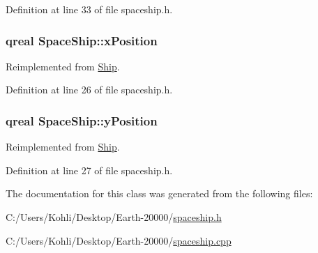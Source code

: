 Definition at line 33 of file spaceship.h.\hypertarget{class_space_ship_a4f960ec3383ec268c7db8c97b97a5c7d}{
\subsubsection[{xPosition}]{\setlength{\rightskip}{0pt plus 5cm}qreal {\bf SpaceShip::xPosition}}}
\label{class_space_ship_a4f960ec3383ec268c7db8c97b97a5c7d}


Reimplemented from \hyperlink{class_ship_a6ccec9a60696c66ede61af7397c73b3c}{Ship}.

Definition at line 26 of file spaceship.h.\hypertarget{class_space_ship_a01360fa6f81ff5c448d68142293f578b}{
\subsubsection[{yPosition}]{\setlength{\rightskip}{0pt plus 5cm}qreal {\bf SpaceShip::yPosition}}}
\label{class_space_ship_a01360fa6f81ff5c448d68142293f578b}


Reimplemented from \hyperlink{class_ship_a5964ed05737d3b6722c7af5e0f173475}{Ship}.

Definition at line 27 of file spaceship.h.

The documentation for this class was generated from the following files:\begin{DoxyCompactItemize}
\item 
C:/Users/Kohli/Desktop/Earth-\/20000/\hyperlink{spaceship_8h}{spaceship.h}\item 
C:/Users/Kohli/Desktop/Earth-\/20000/\hyperlink{spaceship_8cpp}{spaceship.cpp}\end{DoxyCompactItemize}
